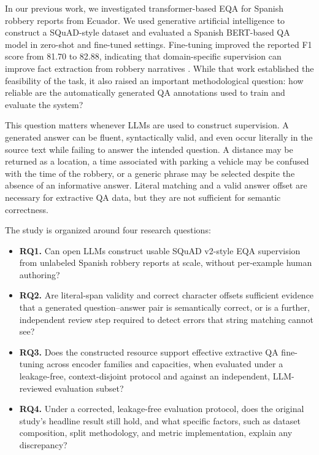 \documentclass[graybox]{SNmult}
\begin{document}
In our previous work, we investigated transformer-based EQA for
Spanish robbery reports from Ecuador. We used generative artificial
intelligence to construct a SQuAD-style dataset and evaluated a
Spanish BERT-based QA model in zero-shot and fine-tuned
settings. Fine-tuning improved the reported F1 score from 81.70 to
82.88, indicating that domain-specific supervision can improve fact
extraction from robbery narratives \cite{falconi2026robberyqa}. While
that work established the feasibility of the task, it also raised an
important methodological question: how reliable are the automatically
generated QA annotations used to train and evaluate the system?

This question matters whenever LLMs are used to construct
supervision. A generated answer can be fluent, syntactically valid,
and even occur literally in the source text while failing to answer
the intended question. A distance may be returned as a location, a
time associated with parking a vehicle may be confused with the time
of the robbery, or a generic phrase may be selected despite the
absence of an informative answer. Literal matching and a valid answer
offset are necessary for extractive QA data, but they are not
sufficient for semantic correctness.

The study is organized around four research questions:
\begin{itemize}
\item \textbf{RQ1.} Can open LLMs construct usable SQuAD v2-style EQA
  supervision from unlabeled Spanish robbery reports at scale, without
  per-example human authoring?
\item \textbf{RQ2.} Are literal-span validity and correct character
  offsets sufficient evidence that a generated question--answer pair
  is semantically correct, or is a further, independent review step
  required to detect errors that string matching cannot see?
\item \textbf{RQ3.} Does the constructed resource support effective
  extractive QA fine-tuning across encoder families and capacities,
  when evaluated under a leakage-free, context-disjoint protocol and
  against an independent, LLM-reviewed evaluation subset?
\item \textbf{RQ4.} Under a corrected, leakage-free evaluation
  protocol, does the original study's headline result still hold, and
  what specific factors, such as dataset composition, split methodology,
  and metric implementation, explain any discrepancy?
\end{itemize}
\end{document}

